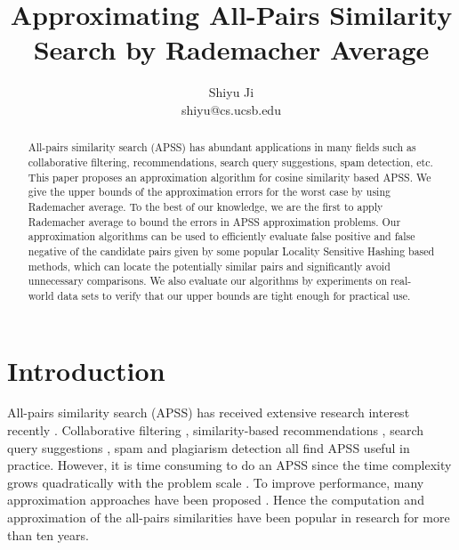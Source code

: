 \documentclass{article}
\begin{document}
\title{\Large\bf Approximating All-Pairs Similarity Search by Rademacher Average}
\author{Shiyu Ji\\ shiyu@cs.ucsb.edu}
\date{}
\maketitle

\newtheorem{definition}{Definition}
\theoremstyle{definition}
\newtheorem{theorem}{Theorem}
\theoremstyle{plain}
\newtheorem{lemma}{Lemma}
\theoremstyle{plain}
\newtheorem{corollary}{Corollary}
\theoremstyle{plain}

\begin{abstract}
All-pairs similarity search (APSS) has abundant applications in many fields such as collaborative filtering, recommendations, search query suggestions, spam detection, etc.
This paper proposes an approximation algorithm for cosine similarity based APSS. 
We give the upper bounds of the approximation errors for the worst case by using Rademacher average.
To the best of our knowledge, we are the first to apply Rademacher average to bound the errors in APSS approximation problems.
{\color{black} Our approximation algorithms can be used to efficiently evaluate false positive and false negative of the candidate pairs given by some popular Locality Sensitive Hashing based methods, which can locate the potentially similar pairs and significantly avoid unnecessary comparisons.}
We also evaluate our algorithms by experiments on real-world data sets to verify that our upper bounds are tight enough for practical use.
\end{abstract}

\section{Introduction}
All-pairs similarity search (APSS) has received extensive research interest recently \cite{BMS07,Xia16,ATY13,TAJY14}. Collaborative filtering \cite{SKK01}, similarity-based recommendations \cite{RV97}, search query suggestions \cite{CJP08}, spam and plagiarism detection \cite{CDG07,LCH06} all find APSS useful in practice. However, it is time consuming to do an APSS since the time complexity grows quadratically with the problem scale \cite{BMS07,ATY13,TAJY14}. To improve performance, many approximation approaches have been proposed \cite{GIM99,FKS03,IM98,Char02,LRU14}. Hence the computation \cite{BMS07,DHM04,Xia16,ATY13,TAJY14} and approximation \cite{LRU14,GIM99,FKS03,IM98,Char02} of the all-pairs similarities have been popular in research for more than ten years.
\end{document}
